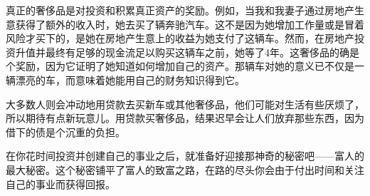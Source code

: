 真正的奢侈品是对投资和积累真正资产的奖励。例如，当我和我妻子通过房地产生意获得了额外的收入时，她去买了辆奔驰汽车。这不是因为她增加工作量或是冒着风险才买下的，是她在房地产生意上的收益为她支付了这辆车。然而，在房地产投资升值并最终有足够的现金流足以购买这辆车之前，她等了4年。这奢侈品的确是个奖励，因为它证明了她知道如何增加自己的资产。那辆车对她的意义已不仅是一辆漂亮的车，而意味着她能用自己的财务知识得到它。

大多数人则会冲动地用贷款去买新车或其他奢侈品，他们可能对生活有些厌烦了，所以期待有点新玩意儿。用贷款买奢侈品，结果迟早会让人们放弃那些东西，因为借下的债是个沉重的负担。

在你花时间投资并创建自己的事业之后，就准备好迎接那神奇的秘密吧——富人的最大秘密。这个秘密铺平了富人的致富之路，在路的尽头你会由于付出时间和关注自己的事业而获得回报。
